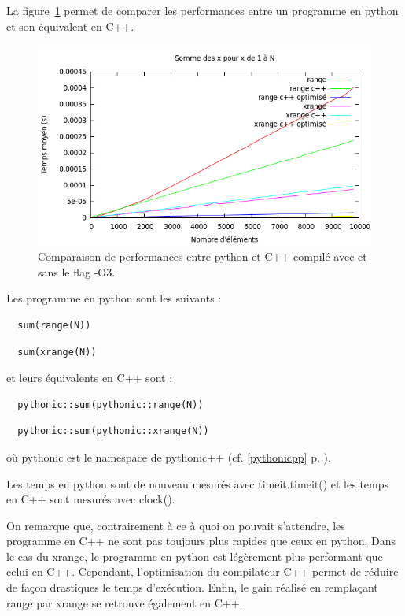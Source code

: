 \documentclass[a4paper]{article}
\begin{document}
La figure~\ref{RangeXrangePyCpp} permet de comparer les performances entre un programme en python et son équivalent en C++.

\begin{figure}[h]
  \includegraphics[scale=0.5]{./Pictures/RangeXrangePyCpp}
  \caption{Comparaison de performances entre python et C++ compilé avec et sans le flag -O3.}
  \label{RangeXrangePyCpp}
\end{figure}

Les programme en python sont les suivants :

\begin{verbatim}
  sum(range(N))
\end{verbatim}

\begin{verbatim}
  sum(xrange(N))
\end{verbatim}

et leurs équivalents en C++ sont :

\begin{verbatim}
  pythonic::sum(pythonic::range(N))
\end{verbatim}

\begin{verbatim}
  pythonic::sum(pythonic::xrange(N))
\end{verbatim}

où pythonic est le namespace de pythonic++ (cf. \ref{pythonicpp} p. \pageref{pythonicpp}).

Les temps en python sont de nouveau mesurés avec timeit.timeit() et les temps en C++ sont mesurés avec clock().

On remarque que, contrairement à ce à quoi on pouvait s'attendre, les programme en C++ ne sont pas toujours plus rapides que ceux en python. Dans le cas du xrange, le programme en python est légèrement plus performant que celui en C++. Cependant, l'optimisation du compilateur C++ permet de réduire de façon drastiques le temps d'exécution. Enfin, le gain réalisé en remplaçant range par xrange se retrouve également en C++. 
\end{document}
